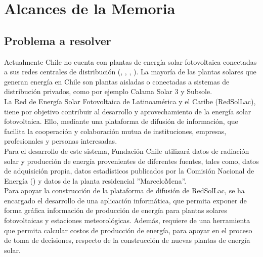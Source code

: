 \chapter{Alcances de la Memoria}
\label{alcances}

\section{Problema a resolver}

Actualmente Chile no cuenta con plantas de energía solar fotovoltaica conectadas a sus redes centrales de distribución (, , , ). La mayoría de las plantas solares que generan energía en Chile son plantas aisladas o conectadas a sistemas de distribución privados, como por ejemplo Calama Solar 3\cite{plantaSolar:1} y Subsole\cite{subsole:2}.\\

La Red de Energía Solar Fotovoltaica de Latinoamérica y el Caribe (RedSolLac), tiene por objetivo contribuir al desarrollo y aprovechamiento de la energía solar fotovoltaica. Ello, mediante una plataforma de difusión de información, que facilita la cooperación y colaboración mutua de instituciones, empresas, profesionales y personas interesadas.\\

Para el desarrollo de este sistema, Fundación Chile utilizará datos de radiación solar y producción de energía provenientes de diferentes fuentes, tales como, datos de adquisición propia, datos estadísticos publicados por la Comisión Nacional de Energía () y datos de la planta residencial ''MarceloMena''.\\

Para apoyar la construcción de la plataforma de difusión de RedSolLac, se ha encargado el desarrollo de una aplicación informática, que permita exponer de forma gráfica información de producción de energía para plantas solares fotovoltaicas y estaciones meteorológicas. Además, requiere de una herramienta que permita calcular costos de producción de energía, para apoyar en el proceso de toma de decisiones, respecto de la construcción de nuevas plantas de energía solar.

